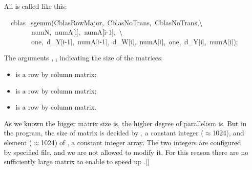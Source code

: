 \documentclass{article}
\begin{document}
\noindent{}All  is called like this:%
\begin{mdpre}%
\noindent~~cblas\_sgemm({CblasRowMajor},~{CblasNoTrans},~{CblasNoTrans},\textbackslash{}\\
~~~~~~~~numN,~numA[i],~numA[i-{1}],~\textbackslash{}\\
~~~~~~~~one,~d\_Y[i-{1}],~numA[i-{1}],~d\_W[i],~numA[i],~one,~d\_Y[i],~numA[i]);%
\end{mdpre}\noindent{}The arguments , ,  indicating the size of the matrices:

\begin{itemize}[noitemsep,topsep=\mdcompacttopsep]%

\item{} is a  row by  column matrix;%

\item{} is a  row by  column matrix;%

\item{} is a  row by  column matrix.%
\end{itemize}%

\noindent{}As we known the bigger matrix size is, the higher degree of  parallelism is. But in the  program, the size of matrix is decided by , a constant integer (\ensuremath{\approx}1024), and element (\ensuremath{\approx}1024) of , a constant integer array. The two integers are configured by specified file, and we are not allowed to modify it. For this reason there are no sufficiently large matrix to enable  to speed up .[]%
\end{document}
